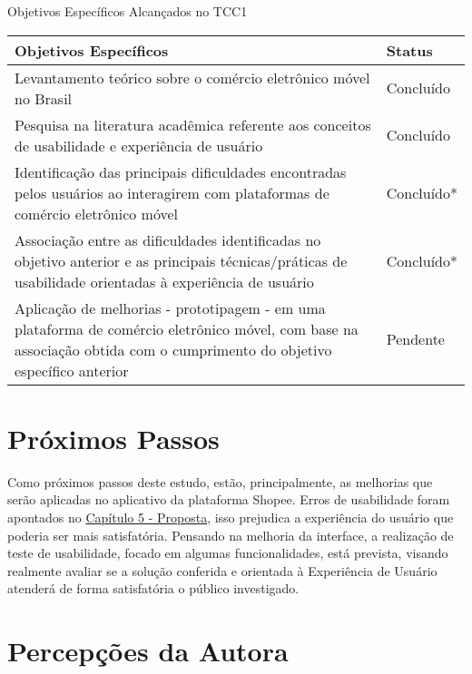 \begin{quadro}
\caption{\label{ObjAl}Objetivos Específicos Alcançados no TCC1}
\centering

\begin{tabular}{|p{10cm}|p{3cm}|}
\hline
\textbf{Objetivos Específicos}                                                                   & \textbf{Status} \\ \hline
Levantamento teórico sobre o comércio eletrônico móvel no Brasil                                 & Concluído       \\ \hline
Pesquisa na literatura acadêmica referente aos conceitos de usabilidade e experiência de usuário & Concluído       \\ \hline
Identificação das principais dificuldades encontradas pelos usuários ao interagirem com plataformas de comércio eletrônico móvel &
  Concluído* \\ \hline
Associação entre as dificuldades identificadas no objetivo anterior e as principais técnicas/práticas de usabilidade orientadas à experiência de usuário &
  Concluído* \\ \hline
Aplicação de melhorias - prototipagem - em uma plataforma de comércio eletrônico móvel, com base na associação obtida com o cumprimento do objetivo específico anterior &
  Pendente \\ \hline
\end{tabular}

\end{quadro} 

\section{Próximos Passos}
\label{propassos}

Como próximos passos deste estudo, estão, principalmente, as melhorias que serão aplicadas no aplicativo da plataforma Shopee. Erros de usabilidade foram apontados no \hyperref[chap:Proposta]{Capítulo 5 - Proposta}, isso prejudica a experiência do usuário que poderia ser mais satisfatória. Pensando na melhoria da interface, a realização de teste de usabilidade, focado em algumas funcionalidades, está prevista, visando realmente avaliar se a solução conferida e orientada à Experiência de Usuário atenderá de forma satisfatória o público investigado.

\section{Percepções da Autora}
    \label{autora}


